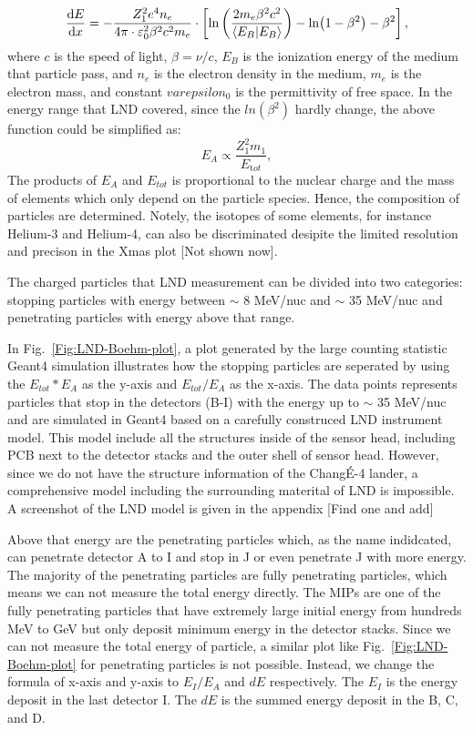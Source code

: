 \begin{equation}
    \frac{\dd E}{\dd x} = - \frac{Z_1^2 e^4 n_e}{4 \pi \cdot \varepsilon_0^2 \beta^2 c^2 m_e} \cdot \left[ \ln\left(\frac{2 m_e  \beta^2 c^2}{\braket{E_B}}\right) - \ln(1 - \beta^2) - \beta^2  \right], 
    \label{eq:BB}
  \end{equation}
where $c$ is the speed of light, $\beta = \nu/c$, $E_B$ is the ionization energy of the medium that particle pass, and $n_e$ is the electron density in the medium, $m_e$ is the electron mass, and constant $varepsilon_0$ is the permittivity of free space.
In the energy range that \ac{LND} covered, since the $ln(\beta^2)$ hardly change, the above function could be simplified as:
\begin{equation}
    E_A \propto \frac{Z_1^2 m_1}{E_{\mathrm tot}},
    \label{eq:BB2}
\end{equation}
The products of $E_A$ and $E_{tot}$ is proportional to the nuclear charge and the mass of elements which only depend on the particle species. Hence, the composition of particles are determined. Notely, the isotopes of some elements, for instance Helium-3 and Helium-4, can also be discriminated desipite the limited resolution and precison in the Xmas plot [Not shown now]. 

The charged particles that LND measurement can be divided into two categories: stopping particles with energy between $\sim$ 8 MeV/nuc and $\sim$ 35 MeV/nuc and penetrating particles with energy above that range.

In Fig.~\ref{Fig:LND-Boehm-plot}, a plot generated by the large counting statistic \ac{Geant4} simulation illustrates how the stopping particles are seperated by using the $E_{tot} * E_A$ as the y-axis and $E_{tot} / E_A$ as the x-axis. The data points represents particles that stop in the detectors (B-I) with the energy up to $\sim$ 35 MeV/nuc and are simulated in \ac{Geant4} based on a carefully construced \ac{LND} instrument model. This model include all the structures inside of the sensor head, including PCB next to the detector stacks and the outer shell of sensor head. However, since we do not have the structure information of the Chang\'E-4 lander, a comprehensive model including the surrounding materital of LND is impossible. 
A screenshot of the LND model is given in the appendix [Find one and add]

Above that energy are the penetrating particles which, as the name indidcated, can penetrate detector A to I and stop in J or even penetrate J with more energy. The majority of the penetrating particles are fully penetrating particles, which means we can not measure the total energy directly. The \acp{MIP} are one of the fully penetrating particles that have extremely large initial energy from hundreds MeV to GeV but only deposit minimum energy in the detector stacks.
Since we can not measure the total energy of particle, a similar plot like Fig.~\ref{Fig:LND-Boehm-plot} for penetrating particles is not possible. Instead, we change the formula of x-axis and y-axis to $E_I/E_A$ and $dE$ respectively. The $E_I$ is the energy deposit in the last detector I. The $dE$ is the summed energy deposit in the B, C, and D.

